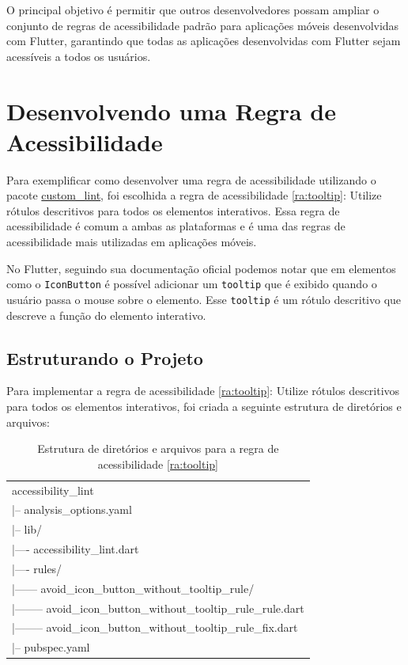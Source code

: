 O principal objetivo é permitir que outros desenvolvedores possam ampliar o conjunto de regras de acessibilidade padrão para aplicações móveis desenvolvidas com Flutter, garantindo que todas as aplicações desenvolvidas com Flutter sejam acessíveis a todos os usuários.

\section{Desenvolvendo uma Regra de Acessibilidade}

Para exemplificar como desenvolver uma regra de acessibilidade utilizando o pacote \href{https://pub.dev/packages/custom_lint}{custom\_lint}, foi escolhida a regra de acessibilidade \ref{ra:tooltip}: Utilize rótulos descritivos para todos os elementos interativos. Essa regra de acessibilidade é comum a ambas as plataformas e é uma das regras de acessibilidade mais utilizadas em aplicações móveis.

No Flutter, seguindo sua documentação oficial \cite{flutter} podemos notar que em elementos como o \texttt{IconButton} é possível adicionar um \texttt{tooltip} que é exibido quando o usuário passa o mouse sobre o elemento. Esse \texttt{tooltip} é um rótulo descritivo que descreve a função do elemento interativo.

\pagebreak

\subsection{Estruturando o Projeto}

Para implementar a regra de acessibilidade \ref{ra:tooltip}: Utilize rótulos descritivos para todos os elementos interativos, foi criada a seguinte estrutura de diretórios e arquivos:

\begin{table}[!htbp]
	\centering
	\renewcommand{\arraystretch}{1.1}
	\caption{Estrutura de diretórios e arquivos para a regra de acessibilidade \ref{ra:tooltip}}
	\label{tab:estrutura-diretorios-arquivos-ra1}
	\ttfamily
	\begin{tabular}{ L{12cm} }
		\hline
		accessibility\_lint \\
		|-- analysis\_options.yaml \\
		|-- lib/ \\
		|---- accessibility\_lint.dart \\
		|---- rules/ \\
		|------ avoid\_icon\_button\_without\_tooltip\_rule/ \\
		|-------- avoid\_icon\_button\_without\_tooltip\_rule\_rule.dart \\
		|-------- avoid\_icon\_button\_without\_tooltip\_rule\_fix.dart \\
		|-- pubspec.yaml \\
		\hline
	\end{tabular}
	\fontfamily{\rmdefault}\selectfont
	\vspace{2mm}
\end{table}

